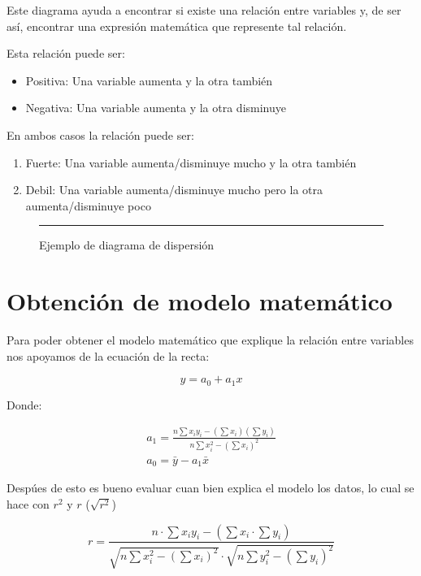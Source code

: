 
Este diagrama ayuda a encontrar si existe una relación entre variables y, de ser así, encontrar una expresión matemática que represente tal relación.

Esta relación puede ser:
\begin{itemize}
    \item Positiva: Una variable aumenta y la otra también
    \item Negativa: Una variable aumenta y la otra disminuye
\end{itemize}

En ambos casos la relación puede ser:

\begin{enumerate}
    \item Fuerte: Una variable aumenta/disminuye mucho y la otra también
    \item Debil: Una variable aumenta/disminuye mucho pero la otra aumenta/disminuye poco
\end{enumerate}

\begin{figure}\centering
    \resizebox{\linewidth}{!}{}
    \rule{\linewidth}{0.5pt}
    \caption{Ejemplo de diagrama de dispersión}
    \label{fig:diagrama_de_dispersion}
\end{figure}

\section{Obtención de modelo matemático}

Para poder obtener el modelo matemático que explique la relación entre variables nos apoyamos de la ecuación de la recta:

\begin{equation}
    y = a_{0} + a_{1}x
\end{equation}

Donde:

\begin{gather}
    a_{1} = \frac{n \sum{x_{i}y_{i}} - (\sum{x_{i}})(\sum{y_{i}}) }{ n \sum{x_{i}^{2}} - (\sum{x_{i}})^{2} }
    \\
    a_{0} = \bar{y} - a_{1}\bar{x}
\end{gather}

Despúes de esto es bueno evaluar cuan bien explica el modelo los datos, lo cual se hace con $r^{2}$ y $r$ ($\sqrt{r^{2}}$)

\begin{equation}
    r = \frac{n \cdot \sum{x_{i}y_{i}} - (\sum{x_{i}}\cdot\sum{y_{i}})}{\sqrt{n\sum{x_{i}^{2}} - (\sum{x_{i}})^{2}} \cdot \sqrt{n\sum{y_{i}^{2}} - (\sum{y_{i}})^{2}}}
\end{equation}

